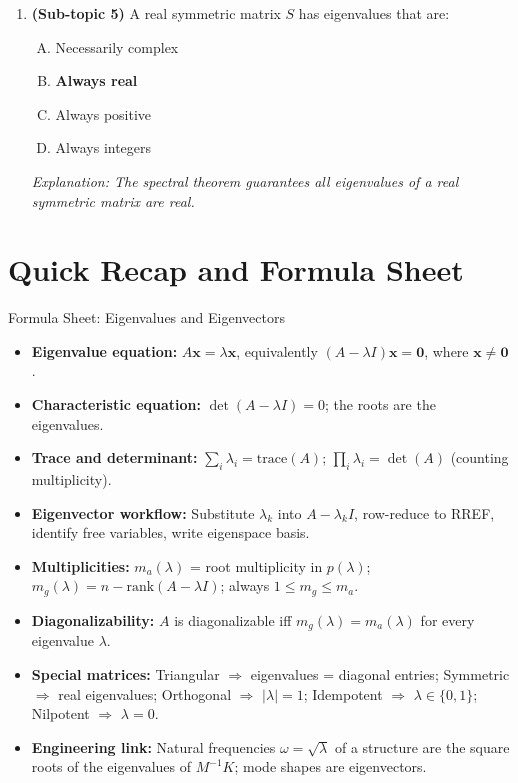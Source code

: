 \documentclass[12pt,a4paper]{article}
\begin{document}
\begin{enumerate}
  \item \textbf{(Sub-topic 5)} A real symmetric matrix $S$ has eigenvalues that are:
  \begin{enumerate}[(A)]
    \item Necessarily complex
    \item \textbf{Always real}
    \item Always positive
    \item Always integers
  \end{enumerate}
  \textit{Explanation: The spectral theorem guarantees all eigenvalues of a real symmetric matrix are real.}

\end{enumerate}

\section{Quick Recap and Formula Sheet}

\begin{learnbox}{Formula Sheet: Eigenvalues and Eigenvectors}
\begin{itemize}
  \item \textbf{Eigenvalue equation:} $A\mathbf{x} = \lambda\mathbf{x}$, equivalently $(A-\lambda I)\mathbf{x}=\mathbf{0}$,
        where $\mathbf{x}\neq\mathbf{0}$.
  \item \textbf{Characteristic equation:} $\det(A - \lambda I) = 0$; the roots are the eigenvalues.
  \item \textbf{Trace and determinant:} $\sum_i \lambda_i = \text{trace}(A)$;\quad
        $\prod_i \lambda_i = \det(A)$ (counting multiplicity).
  \item \textbf{Eigenvector workflow:} Substitute $\lambda_k$ into $A-\lambda_k I$,
        row-reduce to RREF, identify free variables, write eigenspace basis.
  \item \textbf{Multiplicities:} $m_a(\lambda)$ = root multiplicity in $p(\lambda)$;
        $m_g(\lambda) = n - \text{rank}(A-\lambda I)$;
        always $1 \leq m_g \leq m_a$.
  \item \textbf{Diagonalizability:} $A$ is diagonalizable iff $m_g(\lambda) = m_a(\lambda)$
        for every eigenvalue $\lambda$.
  \item \textbf{Special matrices:}
        Triangular $\Rightarrow$ eigenvalues = diagonal entries;
        Symmetric $\Rightarrow$ real eigenvalues;
        Orthogonal $\Rightarrow$ $|\lambda|=1$;
        Idempotent $\Rightarrow$ $\lambda \in \{0,1\}$;
        Nilpotent $\Rightarrow$ $\lambda = 0$.
  \item \textbf{Engineering link:} Natural frequencies $\omega = \sqrt{\lambda}$ of a structure
        are the square roots of the eigenvalues of $M^{-1}K$; mode shapes are eigenvectors.
\end{itemize}
\end{learnbox}
\end{document}

